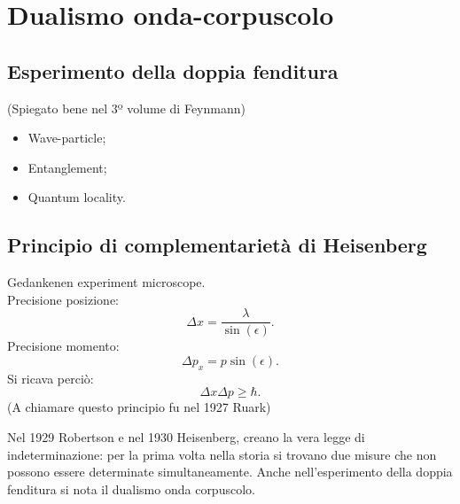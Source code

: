 \section*{Dualismo onda-corpuscolo} %
\label{sec:dualismo_onda_corpuscolo}
\subsection*{Esperimento della doppia fenditura} %
\label{subsec:doppia_fenditura}
(Spiegato bene nel 3º volume di Feynmann)
\begin{itemize}
\item Wave-particle; 
\item Entanglement; 
\item Quantum locality.
\end{itemize}

\subsection*{Principio di complementarietà di Heisenberg} %
\label{subsec:complementarietà_heisenberg}
Gedankenen experiment microscope.
\\ Precisione posizione:
\begin{equation}
\Delta x=\frac{\lambda}{\sin{\left(\epsilon \right)}}.
\end{equation}
Precisione momento:
\begin{equation}
\Delta p_{x}=p\sin{\left(\epsilon \right)}.
\end{equation}
Si ricava perciò:
\begin{equation}
\Delta x\Delta p\ge \hbar .
\end{equation}
(A chiamare questo principio fu nel 1927 Ruark)

Nel 1929 Robertson e nel 1930 Heisenberg, creano la vera legge di indeterminazione: per la prima volta nella storia si trovano due misure che non possono essere determinate simultaneamente. Anche nell'esperimento della doppia fenditura si nota il dualismo onda corpuscolo.